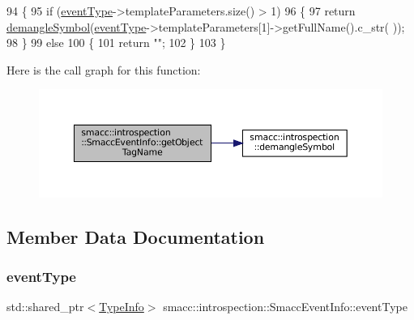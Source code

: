 \begin{DoxyCode}
94 \{
95     \textcolor{keywordflow}{if} (\hyperlink{structsmacc_1_1introspection_1_1SmaccEventInfo_af3bdf1abf797864e681662d92a5515f9}{eventType}->templateParameters.size() > 1)
96     \{
97         \textcolor{keywordflow}{return} \hyperlink{namespacesmacc_1_1introspection_a2f495108db3e57604d8d3ff5ef030302}{demangleSymbol}(\hyperlink{structsmacc_1_1introspection_1_1SmaccEventInfo_af3bdf1abf797864e681662d92a5515f9}{eventType}->templateParameters[1]->getFullName().c\_str(
      ));
98     \}
99     \textcolor{keywordflow}{else}
100     \{
101         \textcolor{keywordflow}{return} \textcolor{stringliteral}{""};
102     \}
103 \}
\end{DoxyCode}
Here is the call graph for this function\+:
\nopagebreak
\begin{figure}[H]
\begin{center}
\leavevmode
\includegraphics[width=350pt]{structsmacc_1_1introspection_1_1SmaccEventInfo_a0aa5d15822e7642079f375ee0f4ff096_cgraph}
\end{center}
\end{figure}


\subsection{Member Data Documentation}
\mbox{\label{structsmacc_1_1introspection_1_1SmaccEventInfo_af3bdf1abf797864e681662d92a5515f9}} 
\subsubsection{\texorpdfstring{event\+Type}{eventType}}
{\footnotesize\ttfamily std\+::shared\+\_\+ptr$<$\hyperlink{classsmacc_1_1introspection_1_1TypeInfo}{Type\+Info}$>$ smacc\+::introspection\+::\+Smacc\+Event\+Info\+::event\+Type}




